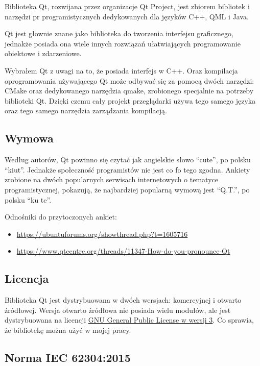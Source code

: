 \par
Biblioteka Qt, rozwijana przez organizacje Qt Project, jest zbiorem bibliotek i narzędzi pr programistycznych dedykowanych dla języków C++, QML i Java.
\par
Qt jest głownie znane jako biblioteka do tworzenia interfejsu graficznego, jednakże posiada ona wiele innych rozwiązań ułatwiających programowanie obiektowe i zdarzeniowe.
\par
Wybrałem Qt z uwagi na to, że posiada interfejs w C++.
Oraz kompilacja oprogramowania używającego Qt może odbywać się za pomocą dwóch narzędzi: CMake oraz dedykowanego narzędzia qmake, zrobionego specjalnie na potrzeby biblioteki Qt.
Dzięki czemu cały projekt przeglądarki używa tego samego języka oraz tego samego narzędzia zarządzania kompilacją.

\subsection{Wymowa}

\par
Według autorów, Qt powinno się czytać jak angielskie słowo \enquote{cute}, po polsku \enquote{kiut}.
Jednakże społeczność programistów nie jest co fo tego zgodna.
Ankiety zrobione na dwóch popularnych serwisach internetowych o tematyce programistycznej, pokazują, że najbardziej popularną wymową jest \enquote{Q.T.}, po polsku \enquote{ku te}.
\par
Odnośniki do przytoczonych ankiet:
\begin{itemize}
    \item \url{https://ubuntuforums.org/showthread.php?t=1605716}
    \item \url{https://www.qtcentre.org/threads/11347-How-do-you-pronounce-Qt}
\end{itemize}

\subsection{Licencja}

\par
Biblioteka Qt jest dystrybuowana w dwóch wersjach: komercyjnej i otwarto źródłowej.
Wersja otwarto źródłowa nie posiada wielu modułów, ale jest dystrybuowana na licencji \href{https://www.gnu.org/licenses/gpl.html}{GNU General Public License w wersji 3}.
Co sprawia, że bibliotekę można użyć w mojej pracy.

\subsection{Norma IEC 62304:2015}

